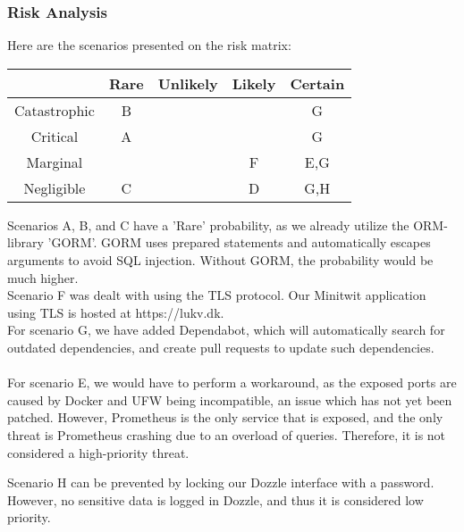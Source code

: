 \subsubsection{Risk Analysis}
Here are the scenarios presented on the risk matrix:
\begin{center}
\begin{tabular}{ |c|c|c|c|c| } 
 \hline
  & Rare & Unlikely & Likely & Certain \\ 
 \hline
 Catastrophic & B &  &  & G\\ 
 \hline
 Critical & A &  &  & G \\ 
 \hline
 Marginal & &  &  F& E,G\\ 
 \hline
 Negligible & C &  & D & G,H\\ 
 \hline
\end{tabular}
\end{center}
Scenarios A, B, and C have a 'Rare' probability, as we already utilize the ORM-library 'GORM'. GORM uses prepared statements and automatically escapes arguments to avoid SQL injection. Without GORM, the probability would be much higher.\\
Scenario F was dealt with using the TLS protocol. Our Minitwit application using TLS is hosted at https://lukv.dk.\\
For scenario G, we have added Dependabot, which will automatically search for outdated dependencies, and create pull requests to update such dependencies.\\\\
For scenario E, we would have to perform a workaround, as the exposed ports are caused by Docker and UFW being incompatible, an issue which has not yet been patched. However, Prometheus is the only service that is exposed, and the only threat is Prometheus crashing due to an overload of queries. Therefore, it is not considered a high-priority threat.


Scenario H can be prevented by locking our Dozzle interface with a password. However, no sensitive data is logged in Dozzle, and thus it is considered low priority.